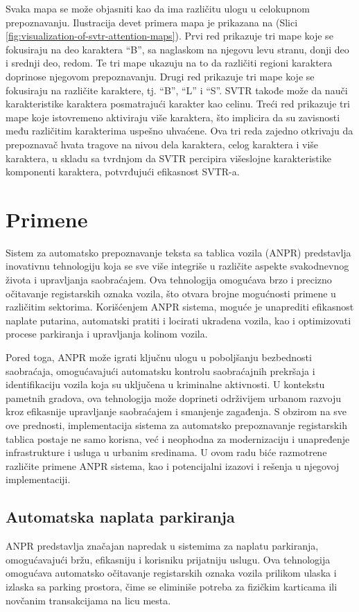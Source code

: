 \documentclass[a4paper,12pt]{article}
\begin{document}
	Svaka mapa se može objasniti kao da ima različitu ulogu u celokupnom prepoznavanju. Ilustracija devet primera mapa je prikazana na (Slici \ref{fig:visualization-of-svtr-attention-maps}). Prvi red prikazuje tri mape koje se fokusiraju na deo karaktera ``B'', sa naglaskom na njegovu levu stranu, donji deo i srednji deo, redom. Te tri mape ukazuju na to da različiti regioni karaktera doprinose njegovom prepoznavanju. Drugi red prikazuje tri mape koje se fokusiraju na različite karaktere, tj. ``B'', ``L'' i ``S''. SVTR takođe može da nauči karakteristike karaktera posmatrajući karakter kao celinu. Treći red prikazuje tri mape koje istovremeno aktiviraju više karaktera, što implicira da su zavisnosti među različitim karakterima uspešno uhvaćene. Ova tri reda zajedno otkrivaju da prepoznavač hvata tragove na nivou dela karaktera, celog karaktera i više karaktera, u skladu sa tvrdnjom da SVTR percipira višeslojne karakteristike komponenti karaktera, potvrđujući efikasnost SVTR-a.
	\newpage
	
	\section{Primene}
	Sistem za automatsko prepoznavanje teksta sa tablica vozila (ANPR) predstavlja inovativnu tehnologiju koja se sve više integriše u različite aspekte svakodnevnog života i upravljanja saobraćajem. Ova tehnologija omogućava brzo i precizno očitavanje registarskih oznaka vozila, što otvara brojne mogućnosti primene u različitim sektorima. Korišćenjem ANPR sistema, moguće je unaprediti efikasnost naplate putarina, automatski pratiti i locirati ukradena vozila, kao i optimizovati procese parkiranja i upravljanja kolinom vozila. 
	
	Pored toga, ANPR može igrati ključnu ulogu u poboljšanju bezbednosti saobraćaja, omogućavajući automatsku kontrolu saobraćajnih prekršaja i identifikaciju vozila koja su uključena u kriminalne aktivnosti. U kontekstu pametnih gradova, ova tehnologija može doprineti održivijem urbanom razvoju kroz efikasnije upravljanje saobraćajem i smanjenje zagađenja. S obzirom na sve ove prednosti, implementacija sistema za automatsko prepoznavanje registarskih tablica postaje ne samo korisna, već i neophodna za modernizaciju i unapređenje infrastrukture i usluga u urbanim sredinama. U ovom radu biće razmotrene različite primene ANPR sistema, kao i potencijalni izazovi i rešenja u njegovoj implementaciji.
	
	\subsection{Automatska naplata parkiranja}
	ANPR predstavlja značajan napredak u sistemima za naplatu parkiranja, omogućavajući bržu, efikasniju i korisniku prijatniju uslugu. Ova tehnologija omogućava automatsko očitavanje registarskih oznaka vozila prilikom ulaska i izlaska sa parking prostora, čime se eliminiše potreba za fizičkim karticama ili novčanim transakcijama na licu mesta. 
	
\end{document}
